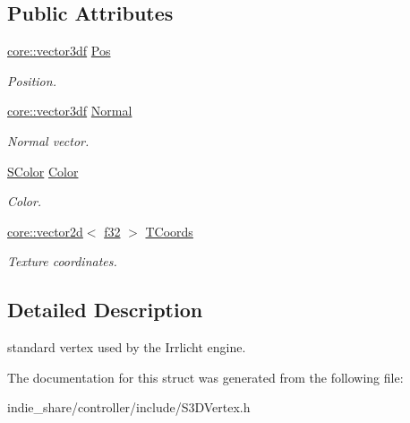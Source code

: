 \subsection*{Public Attributes}
\begin{DoxyCompactItemize}
\item 
\mbox{\label{structirr_1_1video_1_1S3DVertex_ad40e34b3828b1b58283090e20b280e47}} 
\hyperlink{namespaceirr_1_1core_a06f169d08b5c429f5575acb7edbad811}{core\+::vector3df} \hyperlink{structirr_1_1video_1_1S3DVertex_ad40e34b3828b1b58283090e20b280e47}{Pos}
\begin{DoxyCompactList}\small\item\em Position. \end{DoxyCompactList}\item 
\mbox{\label{structirr_1_1video_1_1S3DVertex_a635ed7b736fdc6932ef19b3bd6e77eb9}} 
\hyperlink{namespaceirr_1_1core_a06f169d08b5c429f5575acb7edbad811}{core\+::vector3df} \hyperlink{structirr_1_1video_1_1S3DVertex_a635ed7b736fdc6932ef19b3bd6e77eb9}{Normal}
\begin{DoxyCompactList}\small\item\em Normal vector. \end{DoxyCompactList}\item 
\mbox{\label{structirr_1_1video_1_1S3DVertex_a7b94948eda32f0a86512aafb311967e6}} 
\hyperlink{classirr_1_1video_1_1SColor}{S\+Color} \hyperlink{structirr_1_1video_1_1S3DVertex_a7b94948eda32f0a86512aafb311967e6}{Color}
\begin{DoxyCompactList}\small\item\em Color. \end{DoxyCompactList}\item 
\mbox{\label{structirr_1_1video_1_1S3DVertex_a14c1f48de6debc2346ff2862a883e5cb}} 
\hyperlink{classirr_1_1core_1_1vector2d}{core\+::vector2d}$<$ \hyperlink{namespaceirr_a0277be98d67dc26ff93b1a6a1d086b07}{f32} $>$ \hyperlink{structirr_1_1video_1_1S3DVertex_a14c1f48de6debc2346ff2862a883e5cb}{T\+Coords}
\begin{DoxyCompactList}\small\item\em Texture coordinates. \end{DoxyCompactList}\end{DoxyCompactItemize}


\subsection{Detailed Description}
standard vertex used by the Irrlicht engine. 

The documentation for this struct was generated from the following file\+:\begin{DoxyCompactItemize}
\item 
indie\+\_\+share/controller/include/S3\+D\+Vertex.\+h\end{DoxyCompactItemize}
